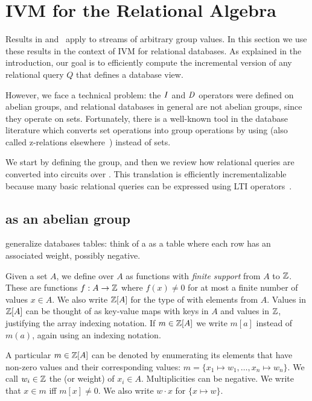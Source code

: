 \section{IVM for the Relational Algebra}\label{sec:relational}

Results in  and~
apply to streams of arbitrary group values.  In this
section we use these results in the context of IVM for
relational databases.  As explained in the introduction, our goal is to
efficiently compute the incremental version of any relational query $Q$
that defines a database view.

However, we face a technical problem: the $\mathit{I}$ and $\mathit{D}$ operators were
defined on abelian groups, and relational databases in general are
not abelian groups, since they operate on sets.  Fortunately,
there is a well-known tool in the database literature
which converts set operations into group operations by using \zrs
(also called z-relations elsewhere~\cite{green-tcs11}) instead of sets.

We start by defining the \zrs group, and then we review how
relational queries are converted into \dbsp circuits  over \zrs.
This translation is efficiently incrementalizable because
many basic relational queries can be expressed using LTI \zr operators~.

\subsection{\zrs as an abelian group}

\zrs generalize databases tables: think of a \zr as a table where each
row has an associated weight, possibly negative.

Given a set $A$, we define  over $A$ as functions with
\emph{finite support} from $A$ to $\mathbb{Z}$.  These are functions $f: A
\rightarrow \mathbb{Z}$ where $f(x) \not= 0$ for at most a finite number of
values $x \in A$.  We also write $\mathbb{Z}[A]$ for the type of \zrs with
elements from $A$.  Values in $\mathbb{Z}[A]$ can be thought of as key-value
maps with keys in $A$ and values in $\mathbb{Z}$, justifying the array
indexing notation.  If $m \in \mathbb{Z}[A]$ we write $m[a]$ instead of
$m(a)$, again using an indexing notation.

A particular \zr $m \in \mathbb{Z}[A]$ can be denoted by enumerating its
elements that have non-zero values and their corresponding values:
$m = \{ x_1 \mapsto w_1, \dots, x_n \mapsto w_n \}$.
We call $w_i \in \mathbb{Z}$ the  (or weight)
of $x_i \in A$.  Multiplicities can be negative.
We write that $x \in m$ iff $m[x] \not= 0$.
We also write $w \cdot x$ for $\{ x \mapsto w \}$.

